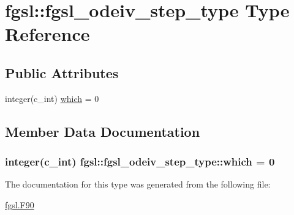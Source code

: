 \hypertarget{structfgsl_1_1fgsl__odeiv__step__type}{}\section{fgsl\+:\+:fgsl\+\_\+odeiv\+\_\+step\+\_\+type Type Reference}
\label{structfgsl_1_1fgsl__odeiv__step__type}
\subsection*{Public Attributes}
\begin{DoxyCompactItemize}
\item 
integer(c\+\_\+int) \hyperlink{structfgsl_1_1fgsl__odeiv__step__type_abbb772a097d345b8bd0a4d190878720a}{which} = 0
\end{DoxyCompactItemize}


\subsection{Member Data Documentation}
\hypertarget{structfgsl_1_1fgsl__odeiv__step__type_abbb772a097d345b8bd0a4d190878720a}{}
\subsubsection[{which}]{\setlength{\rightskip}{0pt plus 5cm}integer(c\+\_\+int) fgsl\+::fgsl\+\_\+odeiv\+\_\+step\+\_\+type\+::which = 0}\label{structfgsl_1_1fgsl__odeiv__step__type_abbb772a097d345b8bd0a4d190878720a}


The documentation for this type was generated from the following file\+:\begin{DoxyCompactItemize}
\item 
\hyperlink{fgsl_8F90}{fgsl.\+F90}\end{DoxyCompactItemize}
